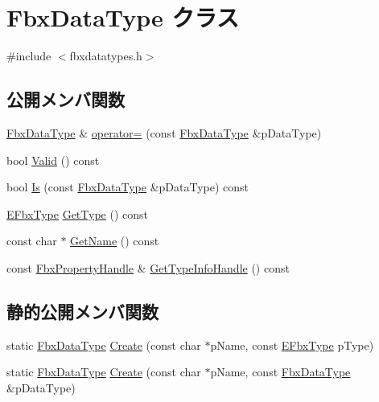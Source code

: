 \hypertarget{class_fbx_data_type}{}\section{Fbx\+Data\+Type クラス}
\label{class_fbx_data_type}


{\ttfamily \#include $<$fbxdatatypes.\+h$>$}

\subsection*{公開メンバ関数}
\begin{DoxyCompactItemize}
\item 
\hyperlink{class_fbx_data_type}{Fbx\+Data\+Type} \& \hyperlink{class_fbx_data_type_adb38a598b2865f0dc137a2ad298987d9}{operator=} (const \hyperlink{class_fbx_data_type}{Fbx\+Data\+Type} \&p\+Data\+Type)
\item 
bool \hyperlink{class_fbx_data_type_a3a03c1554f9a0f6f0536bbe696e4fa67}{Valid} () const
\item 
bool \hyperlink{class_fbx_data_type_ad0bd5c5341dd1dd93b302eb7a0475c81}{Is} (const \hyperlink{class_fbx_data_type}{Fbx\+Data\+Type} \&p\+Data\+Type) const
\item 
\hyperlink{fbxpropertytypes_8h_a73913a5ddfb20e57c6f25e9e6784bd92}{E\+Fbx\+Type} \hyperlink{class_fbx_data_type_a0f3e5c89c7ea0f28aab4b6e6b823d069}{Get\+Type} () const
\item 
const char $\ast$ \hyperlink{class_fbx_data_type_a0970d064518d5521574139dc27465f20}{Get\+Name} () const
\item 
const \hyperlink{class_fbx_property_handle}{Fbx\+Property\+Handle} \& \hyperlink{class_fbx_data_type_a425634131ed095605fd6480e997e7891}{Get\+Type\+Info\+Handle} () const
\end{DoxyCompactItemize}
\subsection*{静的公開メンバ関数}
\begin{DoxyCompactItemize}
\item 
static \hyperlink{class_fbx_data_type}{Fbx\+Data\+Type} \hyperlink{class_fbx_data_type_a9b5a7c24721bb0d633d12a94e523fee3}{Create} (const char $\ast$p\+Name, const \hyperlink{fbxpropertytypes_8h_a73913a5ddfb20e57c6f25e9e6784bd92}{E\+Fbx\+Type} p\+Type)
\item 
static \hyperlink{class_fbx_data_type}{Fbx\+Data\+Type} \hyperlink{class_fbx_data_type_a9acf98349b03a460f44e80993ebb2473}{Create} (const char $\ast$p\+Name, const \hyperlink{class_fbx_data_type}{Fbx\+Data\+Type} \&p\+Data\+Type)
\end{DoxyCompactItemize}

